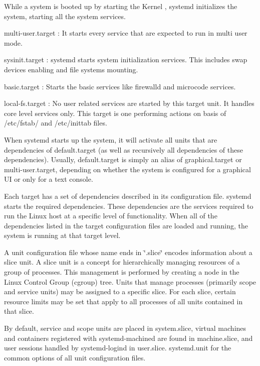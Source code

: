 \begin{DoxyEnumerate}
\begin{DoxyEnumerate}
\item While a system is booted up by starting the Kernel , systemd initializes the system, starting all the system services.
\begin{DoxyItemize}
\item multi-\/user.\+target \+: It starts every service that are expected to run in multi user mode.
\item sysinit.\+target \+: systemd starts system initialization services. This includes swap devices enabling and file systems mounting.
\item basic.\+target \+: Starts the basic services like firewalld and microcode services.
\item local-\/fs.\+target \+: No user related services are started by this target unit. It handles core level services only. This target is one performing actions on basis of /etc/fstab/ and /etc/inittab files.
\item When systemd starts up the system, it will activate all units that are dependencies of default.\+target (as well as recursively all dependencies of these dependencies). Usually, default.\+target is simply an alias of graphical.\+target or multi-\/user.\+target, depending on whether the system is configured for a graphical UI or only for a text console.
\item Each target has a set of dependencies described in its configuration file. systemd starts the required dependencies. These dependencies are the services required to run the Linux host at a specific level of functionality. When all of the dependencies listed in the target configuration files are loaded and running, the system is running at that target level.
\item A unit configuration file whose name ends in \char`\"{}.\+slice\char`\"{} encodes information about a slice unit. A slice unit is a concept for hierarchically managing resources of a group of processes. This management is performed by creating a node in the Linux Control Group (cgroup) tree. Units that manage processes (primarily scope and service units) may be assigned to a specific slice. For each slice, certain resource limits may be set that apply to all processes of all units contained in that slice.
\item By default, service and scope units are placed in system.\+slice, virtual machines and containers registered with systemd-\/machined are found in machine.\+slice, and user sessions handled by systemd-\/logind in user.\+slice. systemd.\+unit for the common options of all unit configuration files. 
\end{DoxyItemize}
\end{DoxyEnumerate}
\end{DoxyEnumerate}